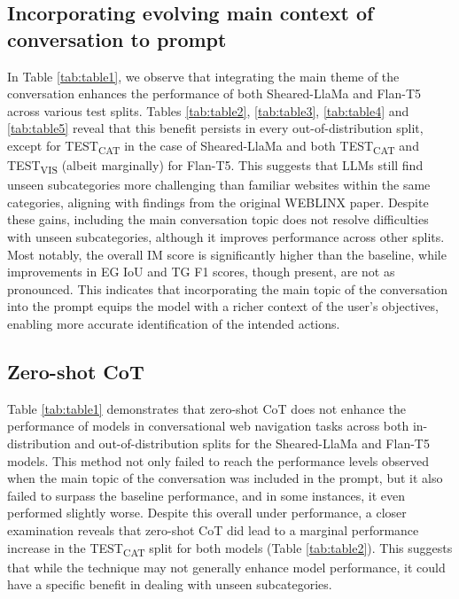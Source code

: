 \documentclass[11pt]{article}
\begin{document}
\subsection{Incorporating evolving main context of conversation to prompt}
In Table \ref{tab:table1}, we observe that integrating the main theme of the conversation enhances the performance of both Sheared-LlaMa and Flan-T5 across various test splits. Tables \ref{tab:table2}, \ref{tab:table3}, \ref{tab:table4} and \ref{tab:table5} reveal that this benefit persists in every out-of-distribution split, except for TEST\textsubscript{CAT} in the case of Sheared-LlaMa and both TEST\textsubscript{CAT} and TEST\textsubscript{VIS} (albeit marginally) for Flan-T5. This suggests that LLMs still find unseen subcategories more challenging than familiar websites within the same categories, aligning with findings from the original WEBLINX paper. Despite these gains, including the main conversation topic does not resolve difficulties with unseen subcategories, although it improves performance across other splits. Most notably, the overall IM score is significantly higher than the baseline, while improvements in EG IoU and TG F1 scores, though present, are not as pronounced. This indicates that incorporating the main topic of the conversation into the prompt equips the model with a richer context of the user's objectives, enabling more accurate identification of the intended actions.

\subsection{Zero-shot CoT}
Table \ref{tab:table1} demonstrates that zero-shot CoT does not enhance the performance of models in conversational web navigation tasks across both in-distribution and out-of-distribution splits for the Sheared-LlaMa and Flan-T5 models. This method not only failed to reach the performance levels observed when the main topic of the conversation was included in the prompt, but it also failed to surpass the baseline performance, and in some instances, it even performed slightly worse. Despite this overall under performance, a closer examination reveals that zero-shot CoT did lead to a marginal performance increase in the TEST\textsubscript{CAT} split for both models (Table \ref{tab:table2}). This suggests that while the technique may not generally enhance model performance, it could have a specific benefit in dealing with unseen subcategories.
\end{document}
